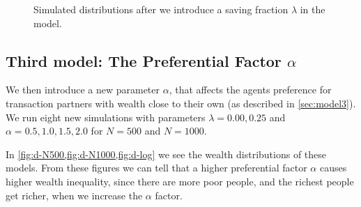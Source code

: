 \documentclass[12pt,a4paper]{article}
\begin{document}
\begin{figure}[!ht]
  \centering

  \caption{Simulated distributions after we introduce a saving fraction $\lambda$ in the model.} \label{fig:c}
\end{figure}

\subsection{Third model: The Preferential Factor $\alpha$}

We then introduce a new parameter $\alpha$, that affects the agents preference for transaction partners with wealth close to their own (as described in \cref{sec:model3}). We run eight new simulations with parameters $\lambda = 0.00,0.25$ and $\alpha = 0.5,1.0,1.5,2.0$ for $N = 500$ and $N = 1000$.

In \cref{fig:d-N500,fig:d-N1000,fig:d-log} we see the wealth distributions of these models.
From these figures we can tell that a higher preferential factor $\alpha$ causes higher wealth inequality, since there are more poor people, and the richest people get richer, when we increase the $\alpha$ factor.
\end{document}

